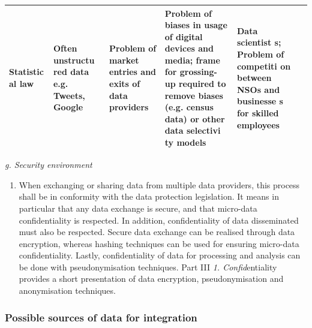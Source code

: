 \documentclass[
]{article}
\providecommand{\tightlist}{%
  \setlength{\itemsep}{0pt}\setlength{\parskip}{0pt}}
\begin{document}
\begin{longtable}[]{@{}llllll@{}}
\begin{minipage}[t]{0.14\columnwidth}
Statistic
al
law\strut
\end{minipage} & \begin{minipage}[t]{0.14\columnwidth}\raggedright
Often
unstructu
red
data e.g.
Tweets,
Google\strut
\end{minipage} & \begin{minipage}[t]{0.14\columnwidth}\raggedright
Problem
of market
entries
and exits
of data
providers\strut
\end{minipage} & \begin{minipage}[t]{0.14\columnwidth}\raggedright
Problem
of biases
in usage
of
digital
devices
and
media;
frame for
grossing-
up
required
to remove
biases
(e.g.
census
data) or
other
data
selectivi
ty
models\strut
\end{minipage} & \begin{minipage}[t]{0.14\columnwidth}\raggedright
Data
scientist
s;
Problem
of
competiti
on
between
NSOs and
businesse
s
for
skilled
employees\strut
\end{minipage}\tabularnewline
\bottomrule
\end{longtable}

\emph{g. Security environment}

\begin{enumerate}
\def\labelenumi{\arabic{enumi}.}
\setcounter{enumi}{212}
\tightlist
\item
  When exchanging or sharing data from multiple data providers, this
  process shall be in conformity with the data protection legislation.
  It means in particular that any data exchange is secure, and that
  micro-data confidentiality is respected. In addition,
  confidentiality of data disseminated must also be respected. Secure
  data exchange can be realised through data encryption, whereas
  hashing techniques can be used for ensuring micro-data
  confidentiality. Lastly, confidentiality of data for processing and
  analysis can be done with pseudonymisation techniques. Part III \emph{1.
  Confid}entiality provides a short presentation of data encryption,
  pseudonymisation and anonymisation techniques.
\end{enumerate}

\hypertarget{d.3.-possible-sources-of-data-for-integration}{%
\subsubsection{Possible sources of data for integration}\label{d.3.-possible-sources-of-data-for-integration}}
\end{document}
